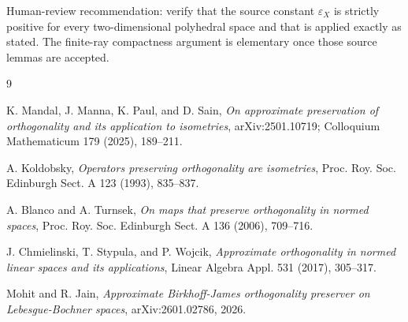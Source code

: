 \documentclass[11pt]{article}
\newcommand{\eps}{\varepsilon}
\begin{document}
Human-review recommendation: verify that the source constant \(\eps_X\) is
strictly positive for every two-dimensional polyhedral space and that
\cite[Corollary 2.16]{MMPS} is applied exactly as stated.  The finite-ray
compactness argument is elementary once those source lemmas are accepted.

\begin{thebibliography}{9}

K. Mandal, J. Manna, K. Paul, and D. Sain,
\emph{On approximate preservation of orthogonality and its application to
isometries}, arXiv:2501.10719; Colloquium Mathematicum 179 (2025), 189--211.

A. Koldobsky,
\emph{Operators preserving orthogonality are isometries}, Proc. Roy. Soc.
Edinburgh Sect. A 123 (1993), 835--837.

A. Blanco and A. Turnsek,
\emph{On maps that preserve orthogonality in normed spaces}, Proc. Roy. Soc.
Edinburgh Sect. A 136 (2006), 709--716.

J. Chmielinski, T. Stypula, and P. Wojcik,
\emph{Approximate orthogonality in normed linear spaces and its applications},
Linear Algebra Appl. 531 (2017), 305--317.

Mohit and R. Jain,
\emph{Approximate Birkhoff-James orthogonality preserver on
Lebesgue-Bochner spaces}, arXiv:2601.02786, 2026.

\end{thebibliography}
\end{document}
